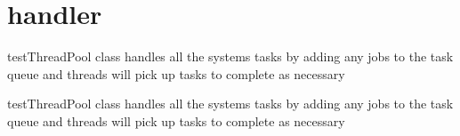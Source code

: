 \hypertarget{group__thread}{}\section{handler}
\label{group__thread}


test\+Thread\+Pool class handles all the systems tasks by adding any jobs to the task queue and threads will pick up tasks to complete as necessary  


test\+Thread\+Pool class handles all the systems tasks by adding any jobs to the task queue and threads will pick up tasks to complete as necessary 


